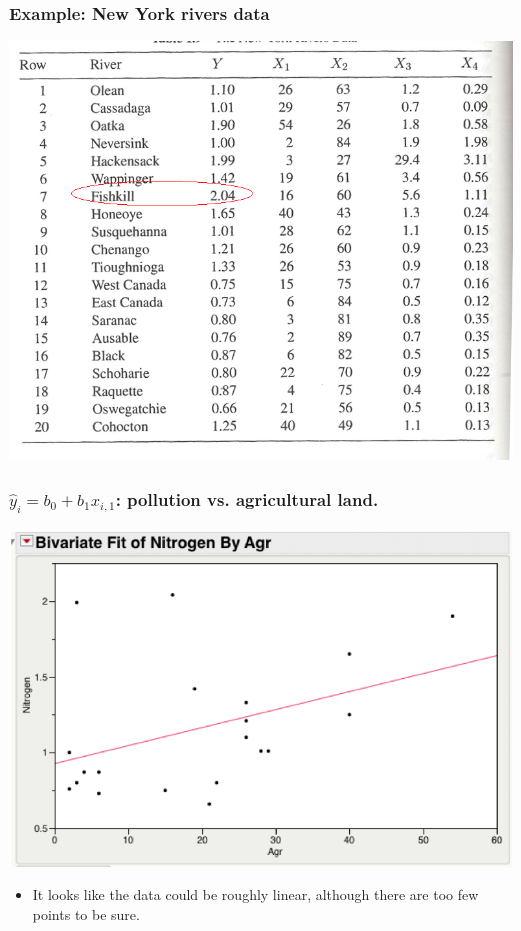 \documentclass[handout]{beamer}
\providecommand{\wh}[1]{\widehat{#1}}
\numberwithin{equation}{section}
\begin{document}
\begin{frame}
\frametitle{Example: New York rivers data}
 \includegraphics{../../fig/riversdata.png}
\end{frame}


\begin{frame}
\frametitle{$\wh{y}_i = b_0 + b_1 x_{i, 1} $: pollution vs. agricultural land.}
\begin{center}
 \includegraphics{../../fig/riversmodel1plot.png}
\end{center}
\begin{itemize}
\pause \item It looks like the data could be roughly linear, although there are too few points to be sure.
\end{itemize}
\end{frame}
\end{document}
